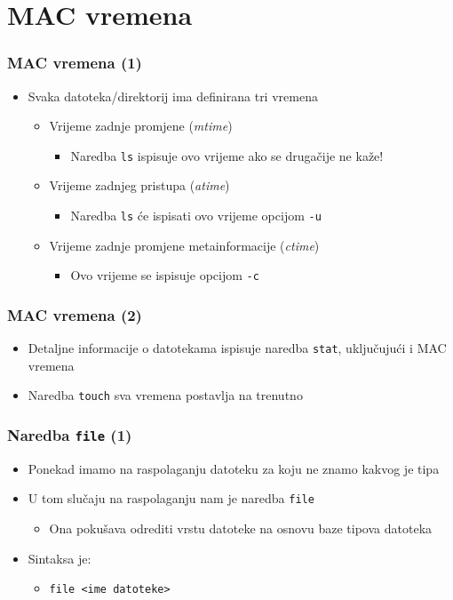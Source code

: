 \documentclass{beamer}
\newcommand{\shell}[1]{\texttt{\small #1}}
\begin{document}
\section{MAC vremena}
\begin{frame}[t]
\frametitle{MAC vremena (1)}
\begin{itemize}
  \item Svaka datoteka/direktorij ima definirana tri vremena
  \begin{itemize}
    \item Vrijeme zadnje promjene (\emph{mtime})
    \begin{itemize}
      \item Naredba \shell{ls} ispisuje ovo vrijeme ako se drugačije
               ne kaže!
    \end{itemize}
    \item Vrijeme zadnjeg pristupa (\emph{atime})
    \begin{itemize}
      \item Naredba \shell{ls} će ispisati ovo vrijeme opcijom
            \shell{-u}
    \end{itemize}
    \item Vrijeme zadnje promjene metainformacije (\emph{ctime})
    \begin{itemize}
      \item Ovo vrijeme se ispisuje opcijom \shell{-c}
    \end{itemize}
  \end{itemize}
\end{itemize}
\end{frame}

\begin{frame}[t]
\frametitle{MAC vremena (2)}
\begin{itemize}
  \item Detaljne informacije o datotekama ispisuje naredba \shell{stat},
        uključujući i MAC vremena
  \item Naredba \shell{touch} sva vremena postavlja na trenutno
\end{itemize}
\end{frame}

\begin{frame}[t]
\frametitle{Naredba \shell{file} (1)}
\begin{itemize}
  \item Ponekad imamo na raspolaganju datoteku za koju ne znamo kakvog je
        tipa
  \item U tom slučaju na raspolaganju nam je naredba \shell{file}
  \begin{itemize}
    \item Ona pokušava odrediti vrstu datoteke na osnovu baze tipova
          datoteka
  \end{itemize}
  \item Sintaksa je:
  \begin{itemize}
    \item[] \shell{file <ime datoteke>}
    \end{itemize}
\end{itemize}
\end{frame}
\end{document}
